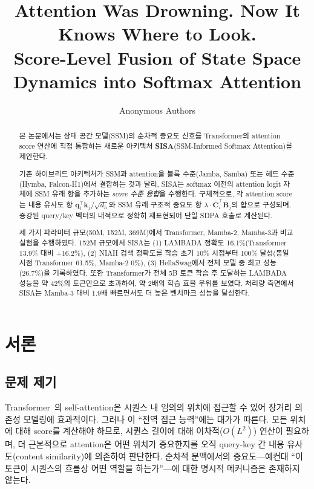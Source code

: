 \documentclass[11pt]{article}
\title{\Large \textbf{Attention Was Drowning. Now It Knows Where to Look.} \\[0.3em]
\large Score-Level Fusion of State Space Dynamics into Softmax Attention}
\author{Anonymous Authors}
\date{}
\begin{document}
\maketitle

\begin{abstract}
본 논문에서는 상태 공간 모델(SSM)의 순차적 중요도 신호를 Transformer의 attention score 연산에 직접 통합하는 새로운 아키텍처 \textbf{SISA}(SSM-Informed Softmax Attention)를 제안한다.

기존 하이브리드 아키텍처가 SSM과 attention을 블록 수준(Jamba, Samba) 또는 헤드 수준(Hymba, Falcon-H1)에서 결합하는 것과 달리, SISA는 softmax 이전의 attention logit 자체에 SSM 유래 항을 추가하는 \emph{score 수준 융합}을 수행한다. 구체적으로, 각 attention score는 내용 유사도 항 $\mathbf{q}_i^\top \mathbf{k}_j / \sqrt{d_h}$와 SSM 유래 구조적 중요도 항 $\lambda \cdot \bar{\mathbf{C}}_i^\top \bar{\mathbf{B}}_j$의 합으로 구성되며, 증강된 query/key 벡터의 내적으로 정확히 재표현되어 단일 SDPA 호출로 계산된다.

세 가지 파라미터 규모(50M, 152M, 369M)에서 Transformer, Mamba-2, Mamba-3과 비교 실험을 수행하였다. 152M 규모에서 SISA는 (1) LAMBADA 정확도 16.1\%(Transformer 13.9\% 대비 +16.2\%), (2) NIAH 검색 정확도를 학습 초기 10\% 시점부터 100\% 달성(동일 시점 Transformer 61.5\%, Mamba-2 0\%), (3) HellaSwag에서 전체 모델 중 최고 성능(26.7\%)을 기록하였다. 또한 Transformer가 전체 5B 토큰 학습 후 도달하는 LAMBADA 성능을 약 42\%의 토큰만으로 초과하여, 약 2배의 학습 효율 우위를 보였다. 처리량 측면에서 SISA는 Mamba-3 대비 1.9배 빠르면서도 더 높은 벤치마크 성능을 달성한다.
\end{abstract}

\section{서론}

\subsection{문제 제기}

Transformer~\citep{vaswani2017attention}의 self-attention은 시퀀스 내 임의의 위치에 접근할 수 있어 장거리 의존성 모델링에 효과적이다. 그러나 이 ``전역 접근 능력''에는 대가가 따른다. 모든 위치에 대해 score를 계산해야 하므로, 시퀀스 길이에 대해 이차적($O(L^2)$) 연산이 필요하며, 더 근본적으로 attention은 어떤 위치가 중요한지를 오직 query-key 간 내용 유사도(content similarity)에 의존하여 판단한다. 순차적 문맥에서의 중요도---예컨대 ``이 토큰이 시퀀스의 흐름상 어떤 역할을 하는가''---에 대한 명시적 메커니즘은 존재하지 않는다.
\end{document}

